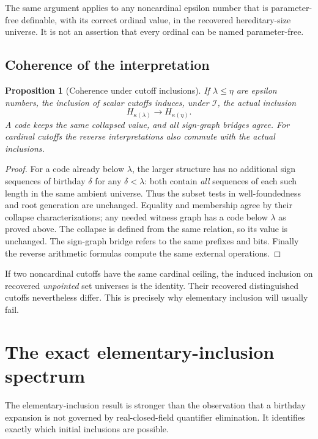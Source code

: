 \documentclass[11pt,letterpaper]{article}
\newtheorem{proposition}[theorem]{Proposition}
\theoremstyle{definition}
\theoremstyle{remark}
\newcommand{\I}{\mathcal I}
\begin{document}
The same argument applies to any noncardinal epsilon number that is
parameter-free definable, with its correct ordinal value, in the recovered
hereditary-size universe. It is not an assertion that every ordinal can be
named parameter-free.

\subsection{Coherence of the interpretation}

\begin{proposition}[Coherence under cutoff inclusions]
\label{prop:coherence}
If $\lambda\le\eta$ are epsilon numbers, the inclusion of scalar cutoffs
induces, under $\I$, the actual inclusion
\[
 H_{\kappa(\lambda)}\longrightarrow H_{\kappa(\eta)}.
\]
A code keeps the same collapsed value, and all sign-graph bridges agree.
For cardinal cutoffs the reverse interpretations also commute with the
actual inclusions.
\end{proposition}
\begin{proof}
For a code already below $\lambda$, the larger structure has no additional
sign sequences of birthday $\delta$ for any $\delta<\lambda$: both contain
\emph{all} sequences of each such length in the same ambient universe.
Thus the subset tests in well-foundedness and root generation are unchanged.
Equality and membership agree by their collapse characterizations; any
needed witness graph has a code below $\lambda$ as proved above. The
collapse is defined from the same relation, so its value is unchanged.
The sign-graph bridge refers to the same prefixes and bits. Finally the
reverse arithmetic formulas compute the same external operations.
\end{proof}

If two noncardinal cutoffs have the same cardinal ceiling, the induced
inclusion on recovered \emph{unpointed} set universes is the identity.
Their recovered distinguished cutoffs nevertheless differ. This is precisely
why elementary inclusion will usually fail.

\section{The exact elementary-inclusion spectrum}
\label{sec:elementary}

The elementary-inclusion result is stronger than the observation that a
birthday expansion is not governed by real-closed-field quantifier
elimination. It identifies exactly which initial inclusions are possible.
\end{document}

